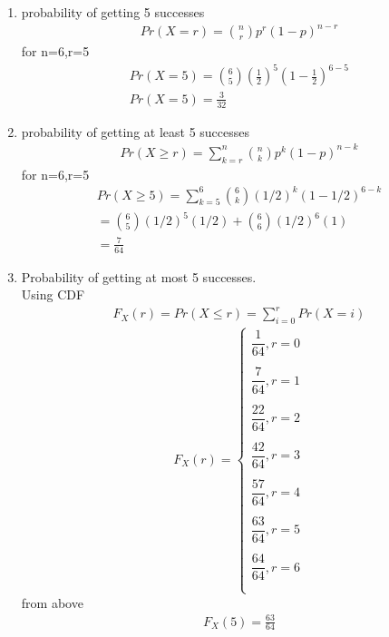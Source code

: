 \documentclass[journal,12pt,twocolumn]{IEEEtran}
\begin{document}
\begin{enumerate}
    \item probability of getting 5 successes
    \begin{align}
        Pr(X=r)= \binom{n}{r} p^{r}(1-p)^{n-r}
    \end{align}
    for n=6,r=5\\
    \begin{align}
        Pr(X=5)= \binom{6}{5} (\frac{1}{2})^{5}(1-\frac{1}{2})^{6-5}\\
        Pr(X=5)=\frac{3}{32}
    \end{align}
    \item probability of getting at least 5 successes
    \begin{align}
        Pr(X\geq r)=\sum ^{n}_{k=r} \binom{n}{k} p^k (1-p)^{n-k}
    \end{align}
    for n=6,r=5
    \begin{align}
        Pr(X\geq5)=\sum^6_{k=5}\binom{6}{k} (1/2)^k (1-1/2)^{6-k}\\
        =\binom{6}{5}(1/2)^5 (1/2) + \binom{6}{6}(1/2)^6 (1)\\
        =\frac{7}{64}
    \end{align}
    \item Probability of getting at most 5 successes.\\
 Using CDF\\
 \begin{align}
     F_{X}(r)=Pr(X\leq r)=\sum^{r}_{i=0}Pr(X=i)
 \end{align}
 $$
     F_{X}(r)= \begin{cases}
     \dfrac{1}{64} ,  r=0\\
     \\
     \dfrac{7}{64} , r=1\\
     \\
     \dfrac{22}{64} , r=2\\
     \\
     \dfrac{42}{64} , r=3\\
     \\
     \dfrac{57}{64} ,r=4\\
     \\
     \dfrac{63}{64} , r=5\\
     \\
     \dfrac{64}{64} , r=6\\
     \\
     
     
     \end{cases}
 $$
     from above
    \begin{align}
        F_{X}(5)=\frac{63}{64}
    \end{align}
    

\end{enumerate}
\end{document}

